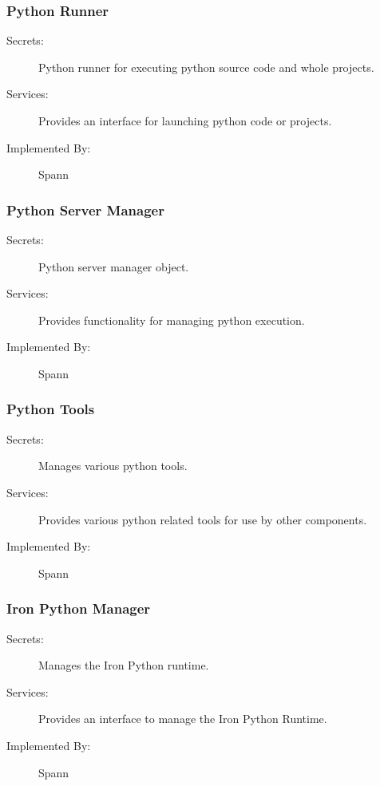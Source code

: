 \documentclass[12pt, titlepage]{article}
\begin{document}
\subsubsection{Python Runner}

\begin{description}
\item[Secrets:] Python runner for executing python source code and whole projects.
\item[Services:] Provides an interface for launching python code or projects.
\item[Implemented By:] Spann
\end{description}


\subsubsection{Python Server Manager}

\begin{description}
\item[Secrets:] Python server manager object.
\item[Services:] Provides functionality for managing python execution.
\item[Implemented By:] Spann
\end{description}


\subsubsection{Python Tools}

\begin{description}
\item[Secrets:] Manages various python tools.
\item[Services:] Provides various python related tools for use by other components.
\item[Implemented By:] Spann
\end{description}


\subsubsection{Iron Python Manager}

\begin{description}
\item[Secrets:] Manages the Iron Python runtime.
\item[Services:] Provides an interface to manage the Iron Python Runtime.
\item[Implemented By:] Spann
\end{description}
\end{document}
